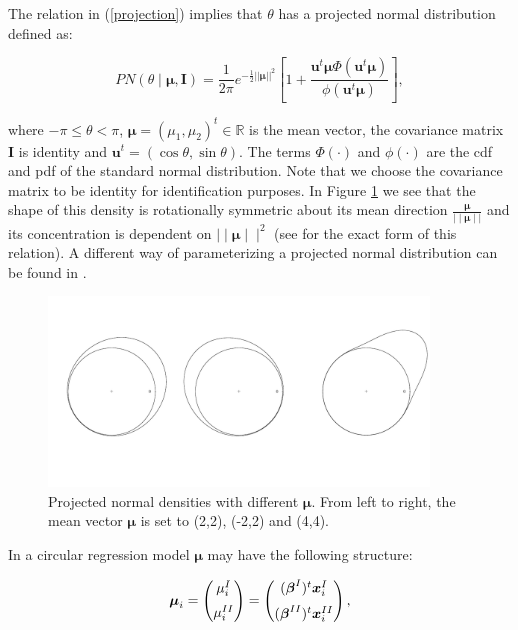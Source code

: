 \documentclass[]{interact}
\begin{document}
The relation in (\ref{projection}) implies that $\theta$ has a projected normal
distribution defined as:

\begin{equation}
PN(\theta \mid \boldsymbol{\mu}, \boldsymbol{I})  = \frac{1}{2 \pi} e^{-\frac{1}{2}\vert \vert \boldsymbol\mu \vert \vert ^ 2} \left[1+\frac{\boldsymbol{u}^t\boldsymbol\mu\Phi(\boldsymbol{u}^t\boldsymbol\mu)}{\phi(\boldsymbol{u}^t\boldsymbol\mu)}\right],
\end{equation}

\noindent where $-\pi \leq \theta < \pi$, $\boldsymbol{\mu} = (\mu_1, \mu_2)^t \in
\mathbb{R}$ is the mean vector, the covariance matrix $\boldsymbol{I}$ is
identity and $\boldsymbol{u}^t = (\cos \theta, \sin \theta)$. The terms
$\Phi(\cdot)$ and $\phi(\cdot)$ are the cdf and pdf of the standard normal
distribution. Note that we choose the covariance matrix to be identity for
identification purposes. In Figure \ref{figPN} we see that the shape of this
density is rotationally symmetric about its mean direction
$\frac{\boldsymbol{\mu}}{\mid\mid\boldsymbol{\mu}\mid\mid}$ and its
concentration is dependent on $\mid\mid \boldsymbol{\mu}\mid\mid^2$ (see
\cite{kendall1974} for the exact form of this relation). A different way of
parameterizing a projected normal distribution can be found in
\cite{wang2012directional}.

\begin{figure}
\centering
\includegraphics[width = 0.9\textwidth]{PN.pdf}
\caption{Projected normal densities with different $\boldsymbol{\mu}$. From left to right, the mean vector $\boldsymbol{\mu}$ is set to (2,2), (-2,2) and (4,4).} 
\label{figPN}
\end{figure}

In a circular regression model $\boldsymbol{\mu}$ may have the following
structure:

\begin{equation}\label{regression}
\boldsymbol{\mu}_{i} = \begin{pmatrix}
  \mu_{i}^{I}  \vspace{0.2cm}  \\
\mu_{i}^{II}
 \end{pmatrix}=\begin{pmatrix}
  (\boldsymbol{\beta}^{I})^{t}\boldsymbol{x}_{i}^{I} \vspace{0.2cm}  \\
  (\boldsymbol{\beta}^{II})^{t}\boldsymbol{x}_{i}^{II} 
 \end{pmatrix},
\end{equation}
\end{document}

